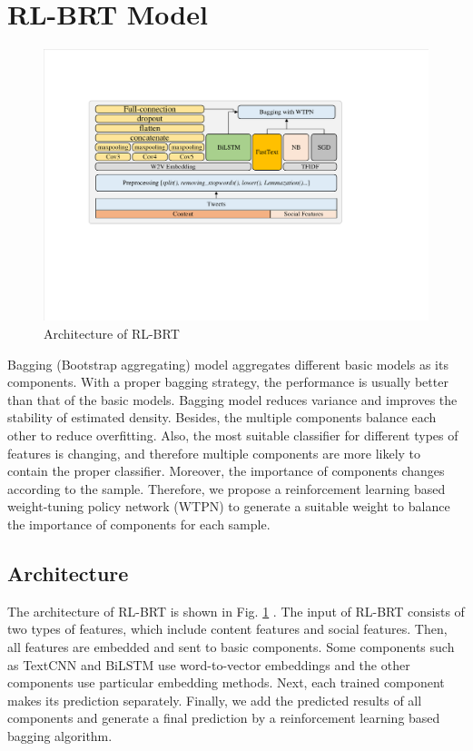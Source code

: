 \section{RL-BRT Model}
\label{sec:model}

\begin{figure}[htbp]
	\hspace{0ex}
	\vspace{0ex}
	\centering
	\includegraphics[width = \textwidth]{fig/structure}
	\caption{Architecture of RL-BRT}
	\label{fig:architecture}
\end{figure}

Bagging (Bootstrap aggregating) model \cite{DBLP:journals/ml/Breiman96b} aggregates different basic models as its components. With a proper bagging strategy, the performance is usually better than that of the basic models. Bagging model reduces variance and improves the
stability of estimated density. Besides, the multiple components balance each other to reduce overfitting. Also, the most suitable classifier for different types of features is changing, and therefore multiple components are more likely to contain the proper classifier. Moreover, the importance of components changes according to the sample. Therefore, we propose a reinforcement learning based weight-tuning policy network (WTPN) to generate a suitable weight to balance the importance of components for each sample. 

\subsection{Architecture}
\label{sec:architecture}
The architecture of RL-BRT is shown in Fig. \ref{fig:architecture} . The input of  RL-BRT consists of two types of features, which include content features and social features. Then, all features are embedded and sent to basic components.  Some components such as TextCNN and BiLSTM use word-to-vector embeddings and the other components use particular embedding methods. Next, each trained component makes its prediction separately. Finally, we add the predicted results of all components and generate a final prediction by a reinforcement learning based bagging algorithm.


